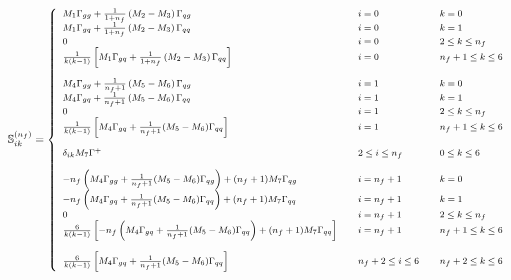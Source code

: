 \documentclass[10pt,a4paper]{article}
\begin{document}
\begin{equation}
\footnotesize
\mathbb{S}_{ik}^{(n_f)} =
\left\{
\begin{array}{lll}
M_1\Gamma_{gg}+\frac{1}{1+n_f}\left(M_2-M_3\right)\Gamma_{qg} &
                                                                      \quad i = 0 &\quad k = 0\\
M_1\Gamma_{gq}+\frac{1}{1+n_f}\left(M_2-M_3\right)\Gamma_{qq} & \quad i = 0 &\quad k =1\\
0 & \quad i = 0 &\quad  2\leq k \leq n_f\\
\frac1{k(k-1)}\left[M_1\Gamma_{gq}+\frac{1}{1+n_f}\left(M_2-M_3\right)\Gamma_{qq}\right] & \quad i = 0 &\quad  n_f+ 1\leq k \leq 6\\
\\
M_4\Gamma_{gg}+\frac{1}{n_f+1}\left(M_5-M_6\right)\Gamma_{qg} & \quad i = 1&\quad  k=0\\
M_4\Gamma_{gq}+\frac{1}{n_f+1}\left(M_5-M_6\right)\Gamma_{qq}& \quad i = 1 &\quad  k=1\\
0 & \quad i = 1 &\quad  2\leq k \leq n_f\\
\frac{1}{k(k-1)}\left[M_4\Gamma_{gq}+\frac{1}{n_f+1}(M_5-M_6)\Gamma_{qq}\right] & \quad i = 1 &\quad  n_f+1\leq k\leq 6\\
\\
\delta_{ik}M_7\Gamma^+&\quad 2\leq i \leq n_f &\quad 0\leq k
                                                         \leq 6\\
\\
-n_f\left(M_4\Gamma_{gg}+\frac{1}{n_f+1}(M_5-M_6)\Gamma_{qg}\right)+(n_f+1)M_7\Gamma_{qg}&\quad i = n_f+1 &\quad k =0\\
-n_f\left(M_4\Gamma_{gq}+\frac{1}{n_f+1}(M_5-M_6)\Gamma_{qq}\right)+(n_f+1)M_7\Gamma_{qq}&\quad i = n_f+1 &\quad k =1\\
0 & \quad i = n_f+1 &\quad  2\leq k \leq n_f\\
  \frac{6}{k(k-1)}\left[-n_f\left(M_4\Gamma_{gq}+\frac{1}{n_f+1}(M_5-M_6)\Gamma_{qq}\right)+(n_f+1)M_7\Gamma_{qq}\right]
&\quad i = n_f+1 &\quad n_f+1 \leq k \leq 6\\
\\
  \frac{6}{k(k-1)}\left[M_4\Gamma_{gq}+\frac{1}{n_f+1}(M_5-M_6)\Gamma_{qq} \right]
& \quad n_f+2\leq i \leq 6 &\quad  n_f+
                                                            2\leq k
                                                            \leq 6\\
\end{array}
\right.
\end{equation}
\end{document}
